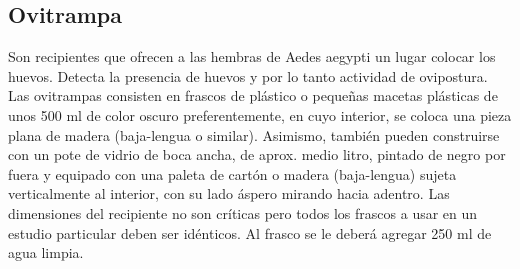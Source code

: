 \subsection{Ovitrampa}
\label{sec:densidad-vectorial-ovitrampa}
Son recipientes que ofrecen a las hembras de Aedes aegypti un lugar colocar
los huevos. Detecta la presencia de huevos y por lo tanto actividad de
ovipostura. Las ovitrampas consisten en frascos de plástico o pequeñas
macetas plásticas de unos 500 ml de color oscuro preferentemente, en cuyo
interior, se coloca una pieza plana de madera (baja-lengua o similar).
Asimismo, también pueden construirse con un pote de vidrio de boca ancha,
de aprox. medio litro, pintado de negro por fuera y equipado con una paleta
de cartón o madera (baja-lengua) sujeta verticalmente al interior, con su
lado áspero mirando hacia adentro. Las dimensiones del recipiente no son
críticas pero todos los frascos a usar en un estudio particular deben ser
idénticos. Al frasco se le deberá agregar 250 ml de agua limpia.
